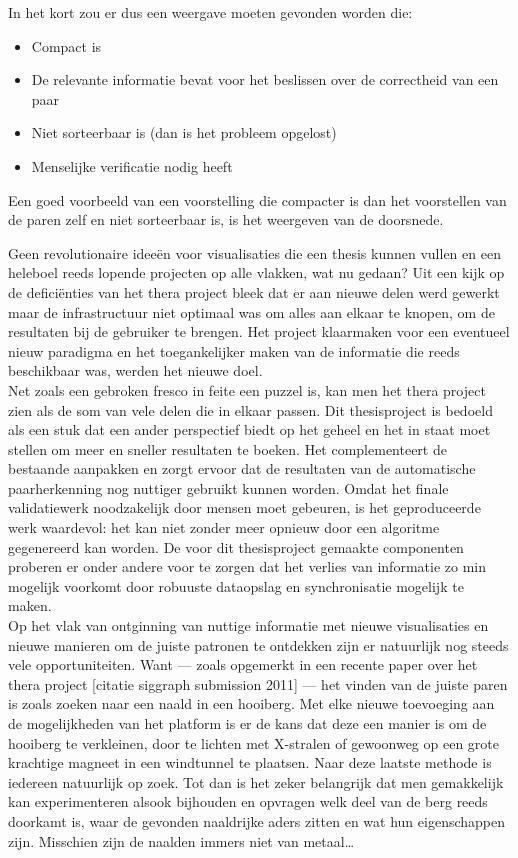 In het kort zou er dus een weergave moeten gevonden worden die:

\begin{itemize}
	\item Compact is
	\item De relevante informatie bevat voor het beslissen over de correctheid van een paar
	\item Niet sorteerbaar is (dan is het probleem opgelost)
	\item Menselijke verificatie nodig heeft
\end{itemize}

Een goed voorbeeld van een voorstelling die compacter is dan het voorstellen van de paren zelf en niet sorteerbaar is, is het weergeven van de doorsnede. 

Geen revolutionaire idee\"en voor visualisaties die een thesis kunnen vullen en een heleboel reeds lopende projecten op alle vlakken, wat nu gedaan? Uit een kijk op de defici\"enties van het thera project bleek dat er aan nieuwe delen werd gewerkt maar de infrastructuur niet optimaal was om alles aan elkaar te knopen, om de resultaten bij de gebruiker te brengen. Het project klaarmaken voor een eventueel nieuw paradigma en het toegankelijker maken van de informatie die reeds beschikbaar was, werden het nieuwe doel.\\

Net zoals een gebroken fresco in feite een puzzel is, kan men het thera project zien als de som van vele delen die in elkaar passen. Dit thesisproject is bedoeld als een stuk dat een ander perspectief biedt op het geheel en het in staat moet stellen om meer en sneller resultaten te boeken. Het complementeert de bestaande aanpakken en zorgt ervoor dat de resultaten van de automatische paarherkenning nog nuttiger gebruikt kunnen worden. Omdat het finale validatiewerk noodzakelijk door mensen moet gebeuren, is het geproduceerde werk waardevol: het kan niet zonder meer opnieuw door een algoritme gegenereerd kan worden. De voor dit thesisproject gemaakte componenten proberen er onder andere voor te zorgen dat het verlies van informatie zo min mogelijk voorkomt door robuuste dataopslag en synchronisatie mogelijk te maken.\\

Op het vlak van ontginning van nuttige informatie met nieuwe visualisaties en nieuwe manieren om de juiste patronen te ontdekken zijn er natuurlijk nog steeds vele opportuniteiten. Want --- zoals opgemerkt in een recente paper over het thera project [citatie siggraph submission 2011] --- het vinden van de juiste paren is zoals zoeken naar een naald in een hooiberg. Met elke nieuwe toevoeging aan de mogelijkheden van het platform is er de kans dat deze een manier is om de hooiberg te verkleinen, door te lichten met X-stralen of gewoonweg op een grote krachtige magneet in een windtunnel te plaatsen. Naar deze laatste methode is iedereen natuurlijk op zoek. Tot dan is het zeker belangrijk dat men gemakkelijk kan experimenteren alsook bijhouden en opvragen welk deel van de berg reeds doorkamt is, waar de gevonden naaldrijke aders zitten en wat hun eigenschappen zijn. Misschien zijn de naalden immers niet van metaal\ldots